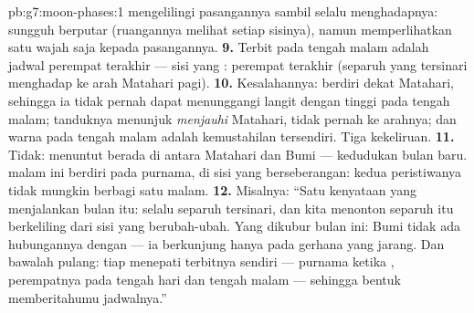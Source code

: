 \begin{solution}{pb:g7:moon-phases:1}
mengelilingi pasangannya sambil selalu menghadapnya: sungguh berputar
(ruangannya melihat setiap sisinya), namun memperlihatkan satu wajah
saja kepada pasangannya.
\textbf{9.} Terbit pada tengah malam adalah jadwal perempat terakhir
--- sisi yang : perempat terakhir (separuh yang tersinari
menghadap ke arah Matahari pagi).
\textbf{10.} Kesalahannya:  berdiri dekat Matahari, sehingga ia
tidak pernah dapat menunggangi langit dengan tinggi pada tengah malam;
tanduknya menunjuk \emph{menjauhi} Matahari, tidak pernah ke arahnya;
dan warna  pada tengah malam adalah kemustahilan
tersendiri. Tiga kekeliruan.
\textbf{11.} Tidak:  menuntut  berada di antara
Matahari dan Bumi --- kedudukan bulan baru.  malam ini berdiri
pada purnama, di sisi yang berseberangan: kedua peristiwanya tidak
mungkin berbagi satu malam.
\textbf{12.} Misalnya: ``Satu kenyataan yang menjalankan bulan itu:
 selalu separuh tersinari, dan kita menonton separuh itu berkeliling
dari sisi yang berubah-ubah. Yang dikubur bulan ini:  Bumi
tidak ada hubungannya dengan  --- ia berkunjung hanya pada
gerhana yang jarang. Dan bawalah  pulang: tiap  menepati 
terbitnya sendiri --- purnama ketika , perempatnya
pada tengah hari dan tengah malam --- sehingga bentuk 
memberitahumu jadwalnya.''
\end{solution}
